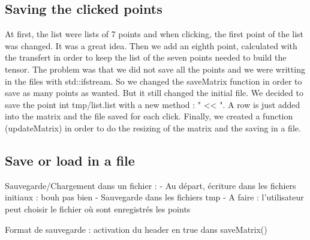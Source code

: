 \documentclass{report}
\begin{document}
\subsection{Saving the clicked points}
At first, the list were lists of 7 points and when clicking, the first point of the list was changed. It was a great idea. 
Then we add an eighth point, calculated with the transfert in order to keep the list of the seven points needed to build the tensor. The problem was that we did not save all the points and we were writting in the files with std::ifstream. So we changed the saveMatrix function in order to save as many points as wanted. But it still changed the initial file. 
We decided to save the point int tmp/list.list with a new method : " << ". A row is just added into the matrix and the file saved for each click. 
Finally, we created a function (updateMatrix) in order to do the resizing of the matrix and the saving in a file. 

\subsection{Save or load in a file}
Sauvegarde/Chargement dans un fichier :
    - Au départ, écriture dans les fichiers initiaux : bouh pas bien
    - Sauvegarde dans les fichiers tmp
    - A faire : l’utilisateur peut choisir le fichier où sont enregistrés les points

Format de sauvegarde : activation du header en true dans saveMatrix()
\end{document}
